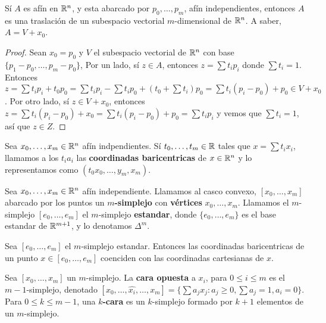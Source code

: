 \begin{corollary}
    S\'i $A$ es af\'in en  $\mathbb{R}^n$, y esta abarcado por  $p_0, \dots, p_m$,
    af\'in independientes, entonces $A$ es una traslaci\'on de un subespacio
    vectorial $m$-dimensional de $\mathbb{R}^n$. A saber,  $A=V+x_0$.
\end{corollary}
\begin{proof}
    Sean $x_0=p_0$ y $V$ el subespacio vectorial de $\mathbb{R}^n$ con base  $\{p_1-p_0,
    \dots, p_m-p_0\}$, Por un lado, s\'i $z \in A$, entonces  $z=\sum{t_ip_i}$
    donde $\sum{t_i}=1$. Entonces
    $z=\sum{t_ip_i}+t_0p_0=\sum{t_ip_i}-\sum{t_ip_0}+(t_0+\sum{t_i})p_0=
    \sum{t_i(p_i-p_0)}+p_0 \in V+x_0$. Por otro lado, s\'i $z \in V+x_0$,
    entonces $z=\sum{t_i(p_i-p_0)}+x_0=\sum{t_i(p_i-p_0)}+p_0=\sum{t_ip_i}$ y
    vemos que $\sum{t_i}=1$, as\'i que $z \in Z$.
\end{proof}

\begin{definition}
    Sea $x_0, \dots, x_m \in \mathbb{R}^n$ af\'in indpendientes. S\'i $t_0, \dots, t_m
    \in \mathbb{R}$ tales que $x=\sum{t_ix_i}$, llamamos a los $t_ia_i$ las
    \textbf{coordinadas baricentricas} de $x \in \mathbb{R}^n$ y lo representamos como
    $(t_0x_0, \dots, y_m,x_m)$.
\end{definition}

\begin{definition}
    Sea $x_0, \dots, x_m \in \mathbb{R}^n$ af\'in independiente. Llamamos al casco
    convexo, $[x_0, \dots, x_m]$ abarcado por los puntos un
    \textbf{$m$-simplejo} con \textbf{v\'ertices} $x_0, \dots, x_m$. Llamamos el
    $m$-simplejo  $[e_0, \dots, e_m]$ el $m$-simplejo \textbf{estandar}, donde
    $\{e_0, \dots, e_m\}$ es el base estandar de $\mathbb{R}^{m+1}$, y lo denotamos
    $\Delta^{m}$.
\end{definition}

\begin{lemma}\label{10.27}
    Sea $[e_0, \dots, e_m]$ el $m$-simplejo estandar. Entonces las coordinadas
    baricentricas de un punto $x \in [e_0, \dots, e_m]$ coenciden con las
    coordinadas cartesianas de $x$.
\end{lemma}

\begin{definition}
    Sea $[x_0, \dots, x_m]$ un $m$-simplejo. La \textbf{cara opuesta} a $x_i$,
    para  $0 \leq i \leq m$ es el $m-1$-simplejo, denotado  $[x_0, \dots, \hat{x_i},
    \dots, x_m]=\{\sum{a_jx_j} : a_j \geq 0, \sum{a_j}=1, a_i=0\}$. Para $0 \leq
    k \leq m-1$, una \textbf{$k$-cara} es un $k$-simplejo formado por $k+1$
    elementos de un $m$-simplejo.
\end{definition}

